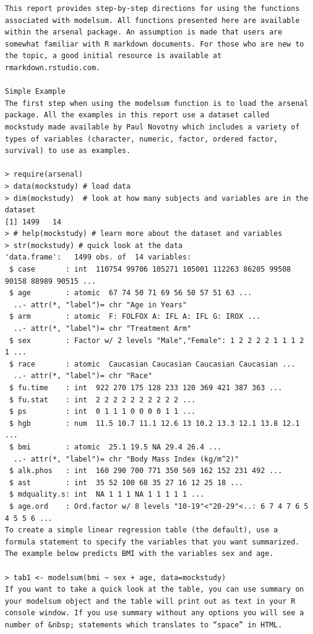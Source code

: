 \documentclass[
]{book}
\begin{document}
\begin{verbatim}
This report provides step-by-step directions for using the functions associated with modelsum. All functions presented here are available within the arsenal package. An assumption is made that users are somewhat familiar with R markdown documents. For those who are new to the topic, a good initial resource is available at rmarkdown.rstudio.com.

Simple Example
The first step when using the modelsum function is to load the arsenal package. All the examples in this report use a dataset called mockstudy made available by Paul Novotny which includes a variety of types of variables (character, numeric, factor, ordered factor, survival) to use as examples.

> require(arsenal)
> data(mockstudy) # load data
> dim(mockstudy)  # look at how many subjects and variables are in the dataset 
[1] 1499   14
> # help(mockstudy) # learn more about the dataset and variables
> str(mockstudy) # quick look at the data
'data.frame':   1499 obs. of  14 variables:
 $ case       : int  110754 99706 105271 105001 112263 86205 99508 90158 88989 90515 ...
 $ age        : atomic  67 74 50 71 69 56 50 57 51 63 ...
  ..- attr(*, "label")= chr "Age in Years"
 $ arm        : atomic  F: FOLFOX A: IFL A: IFL G: IROX ...
  ..- attr(*, "label")= chr "Treatment Arm"
 $ sex        : Factor w/ 2 levels "Male","Female": 1 2 2 2 2 1 1 1 2 1 ...
 $ race       : atomic  Caucasian Caucasian Caucasian Caucasian ...
  ..- attr(*, "label")= chr "Race"
 $ fu.time    : int  922 270 175 128 233 120 369 421 387 363 ...
 $ fu.stat    : int  2 2 2 2 2 2 2 2 2 2 ...
 $ ps         : int  0 1 1 1 0 0 0 0 1 1 ...
 $ hgb        : num  11.5 10.7 11.1 12.6 13 10.2 13.3 12.1 13.8 12.1 ...
 $ bmi        : atomic  25.1 19.5 NA 29.4 26.4 ...
  ..- attr(*, "label")= chr "Body Mass Index (kg/m^2)"
 $ alk.phos   : int  160 290 700 771 350 569 162 152 231 492 ...
 $ ast        : int  35 52 100 68 35 27 16 12 25 18 ...
 $ mdquality.s: int  NA 1 1 1 NA 1 1 1 1 1 ...
 $ age.ord    : Ord.factor w/ 8 levels "10-19"<"20-29"<..: 6 7 4 7 6 5 4 5 5 6 ...
To create a simple linear regression table (the default), use a formula statement to specify the variables that you want summarized. The example below predicts BMI with the variables sex and age.

> tab1 <- modelsum(bmi ~ sex + age, data=mockstudy)
If you want to take a quick look at the table, you can use summary on your modelsum object and the table will print out as text in your R console window. If you use summary without any options you will see a number of &nbsp; statements which translates to “space” in HTML.


\end{verbatim}
\end{document}
